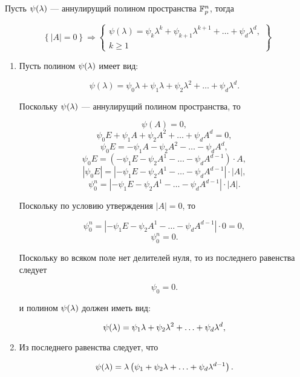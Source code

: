 \begin{statement} \label{statement:APD:space:zero_determinant_and_space_annihilating_polynomials}
	Пусть $\psi (\lambda)$ --- аннулирущий полином пространства $\mathbb{F}^{n}_p$, тогда

		$$
			\left \{ \left | A \right | = 0 \right \}
			\Rightarrow
			\left \{
				\begin{array}{c}
					\psi(\lambda) = \psi_k \lambda^k + \psi_{k+1} \lambda^{k+1} + \dots + \psi_d \lambda^{d},\\
					k \ge 1
				\end{array}
			\right \}
		$$

	\proof

	\begin{enumerate}

		\item Пусть полином $\psi (\lambda)$ имеет вид:

			$$ \psi(\lambda) = \psi_0 \lambda + \psi_1 \lambda + \psi_2 \lambda^2 + \ldots + \psi_d \lambda^d. $$

			Поскольку $\psi (\lambda)$ --- аннулирущий полином пространства, то

				$$ \psi(A) = 0, $$
				$$ \psi_0 E + \psi_1 A + \psi_2 A^2 + \ldots + \psi_d A^d = 0, $$
				$$ \psi_0 E = -\psi_1 A - \psi_2 A^2 - \ldots - \psi_d A^d, $$
				$$ \psi_0 E = \left ( -\psi_1 E - \psi_2 A^1 - \ldots - \psi_d A^{d-1} \right ) \cdot A, $$
				$$ \left | \psi_0 E \right | = \left | -\psi_1 E - \psi_2 A^1 - \ldots - \psi_d A^{d-1} \right | \cdot \left | A \right |, $$
				$$ \psi_0^n = \left | -\psi_1 E - \psi_2 A^1 - \ldots - \psi_d A^{d-1} \right | \cdot \left | A \right |. $$

			Поскольку по условию утверждения $\left | A \right | = 0$, то

				$$ \psi_0^n = \left | -\psi_1 E - \psi_2 A^1 - \ldots - \psi_d A^{d-1} \right | \cdot 0 = 0, $$
				$$ \psi_0^n = 0. $$

			Поскольку во всяком поле нет делителей нуля, то из последнего равенства следует

				$$ \psi_0 = 0. $$

			и полином $\psi (\lambda)$ должен иметь вид:

				$$ \psi (\lambda) = \psi_1\lambda + \psi_2\lambda^2 + \ldots + \psi_d\lambda^d, $$

		\item Из последнего равенства следует, что

				$$ \psi (\lambda) = \lambda \left ( \psi_1 + \psi_2\lambda + \ldots + \psi_d\lambda^{d-1} \right ). $$


\end{enumerate}
\end{statement}
